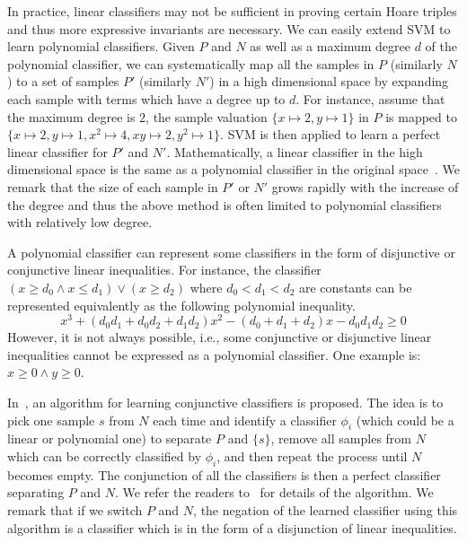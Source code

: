 In practice, linear classifiers may not be sufficient in proving certain Hoare triples and thus more expressive invariants are necessary. We can easily extend SVM to learn polynomial classifiers. Given $P$ and $N$ as well as a maximum degree $d$ of the polynomial classifier, we can systematically map all the samples in $P$ (similarly $N$) to a set of samples $P'$ (similarly $N'$) in a high dimensional space by expanding each sample with terms which have a degree up to $d$. For instance, assume that the maximum degree is 2, the sample valuation $\{ x \mapsto 2, y \mapsto 1\}$ in $P$ is mapped to $\{x \mapsto 2, y \mapsto 1, x^2 \mapsto 4, xy \mapsto 2, y^2 \mapsto 1\}$.
SVM is then applied to learn a perfect linear classifier for $P'$ and $N'$. Mathematically, a linear classifier in the high dimensional space is the same as a polynomial classifier in the original space~\cite{svm:kernel}.
We remark that the size of each sample in $P'$ or $N'$ grows rapidly with the increase of the degree and thus the above method is often limited to polynomial classifiers with relatively low degree.

A polynomial classifier can represent some classifiers in the form of disjunctive or conjunctive linear inequalities. For instance, the classifier $(x \ge d_0 \wedge x \le d_1) \vee (x \ge d_2)$
where $d_0 < d_1 < d_2$ are constants can be represented equivalently as the following polynomial inequality.
\[
x^3 + (d_0d_1 + d_0d_2 + d_1d_2)x^2 - (d_0 + d_1 + d_2)x - d_0d_1d_2 \geq 0
\]
However, it is not always possible, i.e., some conjunctive or disjunctive linear inequalities cannot be expressed as a polynomial classifier. One example is: $x \ge 0 \land y \ge 0$.

In~\cite{sharma2012interpolants}, an algorithm for learning conjunctive classifiers is proposed. The idea is to pick one sample $s$ from $N$ each time and identify a classifier $\phi_i$ (which could be a linear or polynomial one) to separate $P$ and $\{s\}$, remove all samples from $N$ which can be correctly classified by $\phi_i$, and then repeat the process until $N$ becomes empty. The conjunction of all the classifiers is then a perfect classifier separating $P$ and $N$. We refer the readers to~\cite{sharma2012interpolants} for details of the algorithm. We remark that if we switch $P$ and $N$, the negation of the learned classifier using this algorithm is a classifier which is in the form of a disjunction of linear inequalities. 

